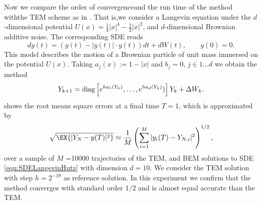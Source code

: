\begin{example}
	Now we compare the order of convergenceand the run time of the \SM method withthe TEM scheme as in 
	\cite{Hutzenthaler2012a}. That is,we consider a  Langevin equation under  the $d$-dimensional potential 
	$U(x)= \frac{1}{4}|x|^4 - \frac{1}{2}|x|^2$, and $d$-dimensional Brownian additive noise. The corresponding
	SDE reads
	\begin{equation}\label{eqn:SDELangevinHutz}
	dy(t) = 
		\left(
			y(t) - |y(t)| \cdot y(t)
		\right)dt
		+ dW(t), \qquad y(0)=0.
	\end{equation}
	This model describes the motion of a Brownian particle of unit mass immersed on the potential $U(x)$. 
	Taking $a_j(x):=1-|x|$ and $b_j=0$, $j\in 1\dots d$ we obtain the \SM method
	\begin{equation}\label{eqn:LangevinLSMethod}
		Y_{k+1} = \operatorname{diag}
		\left[		
			e^{h a_1(Y_k)}, \dots, e^{ha_d(Y_k)}) 
		\right] 
		Y_k+
		\Delta W_k.
	\end{equation}
	 shows the root means square errors at a final time $T=1$, which is approximated by
	\begin{equation}
		\sqrt{\EX{|Y_N - y(T)|^2}} \approx 
		\frac{1}{M}
		\left(
		\sum_{i=1}^M
		|y_i(T) - Y_{N,i}|^2	
		\right)^{1/2},
	\end{equation}
	over a sample of $M$ =\num{10000} trajectories of the TEM, \SM  and BEM solutions to SDE 
	\eqref{eqn:SDELangevinHutz} with dimension $d=10$.  We consider the TEM solution with step $h=2^{-19}$ as reference 
	solution. 
	In this experiment we confirm that the \SM method converges with standard order 1/2  and is almost equal accurate 
	than the TEM.


\end{example}
